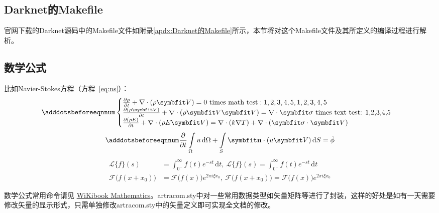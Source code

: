 \subsection{Darknet的Makefile}
官网下载的Darknet源码中的Makefile文件如附录\ref{apdx:Darknet的Makefile}所示，本节将对这个Makefile文件及其所定义的编译过程进行解析。

\subsection{数学公式}

比如Navier-Stokes方程（方程~\eqref{eq:ns}）：
\begin{equation} \label{eq:ns}
    \adddotsbeforeeqnnum%
    \begin{cases}
        \frac{\partial \rho}{\partial t} + \nabla\cdot(\rho\Vector{V}) = 0 \ \mathrm{times\ math\ test: 1,2,3,4,5}, 1,2,3,4,5\\
        \frac{\partial (\rho\Vector{V})}{\partial t} + \nabla\cdot(\rho\Vector{V}\Vector{V}) = \nabla\cdot\Tensor{\sigma} \ \text{times text test: 1,2,3,4,5}\\
        \frac{\partial (\rho E)}{\partial t} + \nabla\cdot(\rho E\Vector{V}) = \nabla\cdot(k\nabla T) + \nabla\cdot(\Tensor{\sigma}\cdot\Vector{V})
    \end{cases}
\end{equation}
\begin{equation}
    \adddotsbeforeeqnnum%
    \frac{\partial }{\partial t}\int\limits_{\Omega} u \, \mathrm{d}\Omega + \int\limits_{S} \unitVector{n}\cdot(u\Vector{V}) \, \mathrm{d}S = \dot{\phi}
\end{equation}
\[
    \begin{split}
        \mathcal{L} \{f\}(s) &= \int _{0^{-}}^{\infty} f(t) e^{-st} \, \mathrm{d}t, \ 
        \mathscr{L} \{f\}(s) = \int _{0^{-}}^{\infty} f(t) e^{-st} \, \mathrm{d}t\\
        \mathcal{F} {\bigl (} f(x+x_{0}) {\bigr )} &= \mathcal{F} {\bigl (} f(x) {\bigr )} e^{2\pi i\xi x_{0}}, \ 
        \mathscr{F} {\bigl (} f(x+x_{0}) {\bigr )} = \mathscr{F} {\bigl (} f(x) {\bigr )} e^{2\pi i\xi x_{0}}
    \end{split}
\]

数学公式常用命令请见 \href{https://en.wikibooks.org/wiki/LaTeX/Mathematics}{WiKibook Mathematics}。artracom.sty中对一些常用数据类型如矢量矩阵等进行了封装，这样的好处是如有一天需要修改矢量的显示形式，只需单独修改artracom.sty中的矢量定义即可实现全文档的修改。


